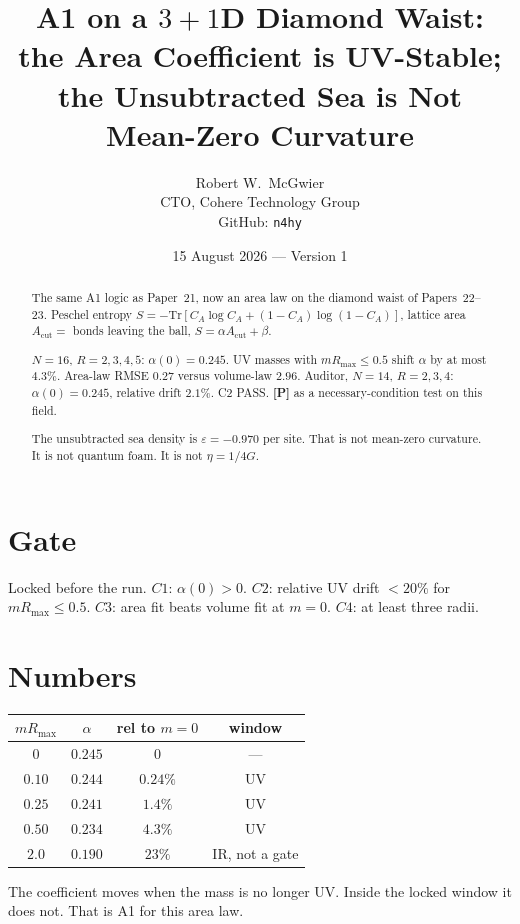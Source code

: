 \documentclass[11pt]{article}
\title{\textbf{A1 on a $3{+}1$D Diamond Waist:\\
the Area Coefficient is UV-Stable;\\
the Unsubtracted Sea is Not Mean-Zero Curvature}}
\author{Robert W.\ McGwier\\
\small CTO, Cohere Technology Group\\
\small GitHub: \texttt{n4hy}}
\date{15 August 2026 --- Version 1}
\newcommand{\pP}{\textbf{[P]}}
\begin{document}
\maketitle

\begin{abstract}
\noindent
The same A1 logic as Paper~21, now an area law on the diamond waist
of Papers~22--23. Peschel entropy
$S=-\mathrm{Tr}[C_A\log C_A+(1-C_A)\log(1-C_A)]$,
lattice area $A_{\mathrm{cut}}=$ bonds leaving the ball,
$S=\alpha A_{\mathrm{cut}}+\beta$.

$N=16$, $R=2,3,4,5$: $\alpha(0)=0.245$. UV masses with
$mR_{\max}\le 0.5$ shift $\alpha$ by at most $4.3\%$.
Area-law RMSE $0.27$ versus volume-law $2.96$.
Auditor, $N=14$, $R=2,3,4$: $\alpha(0)=0.245$, relative drift
$2.1\%$. C2 PASS. \pP{} as a necessary-condition test on this field.

The unsubtracted sea density is $\varepsilon=-0.970$ per site.
That is not mean-zero curvature. It is not quantum foam. It is
not $\eta=1/4G$.
\end{abstract}

\section{Gate}

Locked before the run. $C1$: $\alpha(0)>0$. $C2$: relative UV
drift $<20\%$ for $mR_{\max}\le 0.5$. $C3$: area fit beats volume
fit at $m=0$. $C4$: at least three radii.

\section{Numbers}

\begin{center}
\begin{tabular}{cccc}
\hline
$mR_{\max}$ & $\alpha$ & rel to $m=0$ & window \\
\hline
$0$ & $0.245$ & $0$ & --- \\
$0.10$ & $0.244$ & $0.24\%$ & UV \\
$0.25$ & $0.241$ & $1.4\%$ & UV \\
$0.50$ & $0.234$ & $4.3\%$ & UV \\
$2.0$ & $0.190$ & $23\%$ & IR, not a gate \\
\hline
\end{tabular}
\end{center}

The coefficient moves when the mass is no longer UV. Inside the
locked window it does not. That is A1 for this area law.
\end{document}
